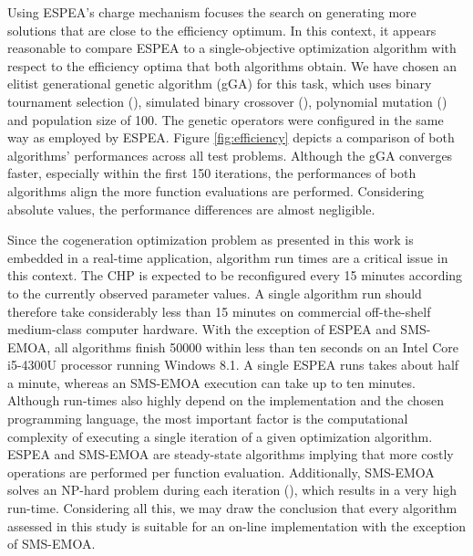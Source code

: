 Using ESPEA's charge mechanism focuses the search on generating more solutions that are close to the efficiency optimum. In this context, it appears reasonable to compare ESPEA to a single-objective optimization algorithm with respect to the efficiency optima that both algorithms obtain. We have chosen an elitist generational genetic algorithm (gGA) for this task, which uses binary tournament selection (\cite{goldberg1991comparative}), simulated binary crossover (\cite{sbx}), polynomial mutation (\cite{polynomialmutation}) and population size of 100. The genetic operators were configured in the same way as employed by ESPEA. Figure \ref{fig:efficiency} depicts a comparison of both algorithms' performances across all test problems. Although the gGA converges faster, especially within the first 150 iterations, the performances of both algorithms align the more function evaluations are performed. Considering absolute values, the performance differences are almost negligible.

Since the cogeneration optimization problem as presented in this work is embedded in a real-time application, algorithm run times are a critical issue in this context. The CHP is expected to be reconfigured every 15 minutes according to the currently observed parameter values. A single algorithm run should therefore take considerably less than 15 minutes on commercial off-the-shelf medium-class computer hardware. With the exception of ESPEA and SMS-EMOA, all algorithms finish \num{50000} within less than ten seconds on an Intel Core i5-4300U processor running Windows 8.1. A single ESPEA runs takes about half a minute, whereas an SMS-EMOA execution can take up to ten minutes. Although run-times also highly depend on the implementation and the chosen programming language, the most important factor is the computational complexity of executing a single iteration of a given optimization algorithm. ESPEA and SMS-EMOA are steady-state algorithms implying that more costly operations are performed per function evaluation. Additionally, SMS-EMOA solves an NP-hard problem during each iteration (\cite{hypervolumecontribution}), which results in a very high run-time. Considering all this, we may draw the conclusion that every algorithm assessed in this study is suitable for an on-line implementation with the exception of SMS-EMOA.

